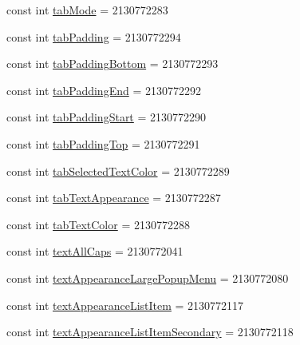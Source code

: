 \begin{DoxyCompactItemize}
const int \mbox{\hyperlink{class_f_w_p_s___app_1_1_droid_1_1_resource_1_1_attribute_a4f81513b4c5c2e8e4c960785f7c61451}{tab\+Mode}} = 2130772283
\item 
const int \mbox{\hyperlink{class_f_w_p_s___app_1_1_droid_1_1_resource_1_1_attribute_a7a9e4e96fd60f49c56e532d7733849bb}{tab\+Padding}} = 2130772294
\item 
const int \mbox{\hyperlink{class_f_w_p_s___app_1_1_droid_1_1_resource_1_1_attribute_ada1175151df8cf7d91b13d00b6246e0d}{tab\+Padding\+Bottom}} = 2130772293
\item 
const int \mbox{\hyperlink{class_f_w_p_s___app_1_1_droid_1_1_resource_1_1_attribute_af12d304caf627577394025d728fba910}{tab\+Padding\+End}} = 2130772292
\item 
const int \mbox{\hyperlink{class_f_w_p_s___app_1_1_droid_1_1_resource_1_1_attribute_ac8cffe391091b36c806a59e3bb9f93cf}{tab\+Padding\+Start}} = 2130772290
\item 
const int \mbox{\hyperlink{class_f_w_p_s___app_1_1_droid_1_1_resource_1_1_attribute_a82371da37866ad02c587396370bf6fcf}{tab\+Padding\+Top}} = 2130772291
\item 
const int \mbox{\hyperlink{class_f_w_p_s___app_1_1_droid_1_1_resource_1_1_attribute_a3cbc47f7f2f2d2ec57f5cfc63ca04e4a}{tab\+Selected\+Text\+Color}} = 2130772289
\item 
const int \mbox{\hyperlink{class_f_w_p_s___app_1_1_droid_1_1_resource_1_1_attribute_a88fcca3b21867bf36ee713147080a550}{tab\+Text\+Appearance}} = 2130772287
\item 
const int \mbox{\hyperlink{class_f_w_p_s___app_1_1_droid_1_1_resource_1_1_attribute_a87c35d3c34c1ed497d634630c2b46d78}{tab\+Text\+Color}} = 2130772288
\item 
const int \mbox{\hyperlink{class_f_w_p_s___app_1_1_droid_1_1_resource_1_1_attribute_a42ca26abf9812c45aab52795b2522f82}{text\+All\+Caps}} = 2130772041
\item 
const int \mbox{\hyperlink{class_f_w_p_s___app_1_1_droid_1_1_resource_1_1_attribute_a30373a71b53deb544b052bab20ff9d35}{text\+Appearance\+Large\+Popup\+Menu}} = 2130772080
\item 
const int \mbox{\hyperlink{class_f_w_p_s___app_1_1_droid_1_1_resource_1_1_attribute_a668182f10f4cbcb28a9cfa61034b2884}{text\+Appearance\+List\+Item}} = 2130772117
\item 
const int \mbox{\hyperlink{class_f_w_p_s___app_1_1_droid_1_1_resource_1_1_attribute_a64cf97759132b1873a6a40752575fd43}{text\+Appearance\+List\+Item\+Secondary}} = 2130772118
\item 

\end{DoxyCompactItemize}
